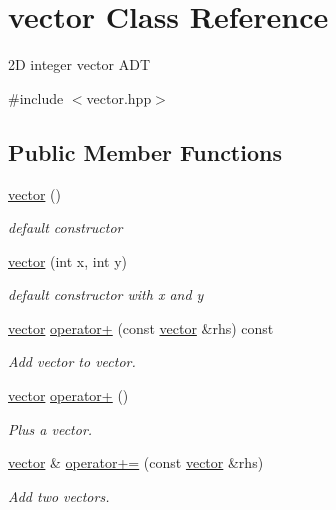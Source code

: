 \hypertarget{classvector}{}\section{vector Class Reference}
\label{classvector}


2D integer vector A\+DT  




{\ttfamily \#include $<$vector.\+hpp$>$}

\subsection*{Public Member Functions}
\begin{DoxyCompactItemize}
\item 
\hyperlink{classvector_a28ed60409cde794caea6a40ec8d832b2}{vector} ()
\begin{DoxyCompactList}\small\item\em default constructor \end{DoxyCompactList}\item 
\hyperlink{classvector_a7fa147d3199381b9d8b32753bd1a6968}{vector} (int x, int y)
\begin{DoxyCompactList}\small\item\em default constructor with x and y \end{DoxyCompactList}\item 
\hyperlink{classvector}{vector} \hyperlink{classvector_a2ab7f62262c6f0c6ade3bd1879e6001e}{operator+} (const \hyperlink{classvector}{vector} \&rhs) const 
\begin{DoxyCompactList}\small\item\em Add vector to vector. \end{DoxyCompactList}\item 
\hyperlink{classvector}{vector} \hyperlink{classvector_a8b2ae2c5e7d5ce78e1a06aa5233233f4}{operator+} ()
\begin{DoxyCompactList}\small\item\em Plus a vector. \end{DoxyCompactList}\item 
\hyperlink{classvector}{vector} \& \hyperlink{classvector_a401c12597814627f350a8cd663b6dba5}{operator+=} (const \hyperlink{classvector}{vector} \&rhs)
\begin{DoxyCompactList}\small\item\em Add two vectors. \end{DoxyCompactList}\item 

\end{DoxyCompactItemize}
